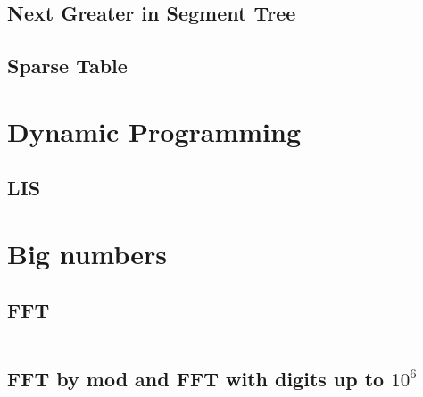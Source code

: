 \subsection{Next Greater in Segment Tree}

\subsection{Sparse Table}


\section{Dynamic Programming}

\subsection{LIS}


\section{Big numbers}
\subsection{FFT}
\inputminted[mathescape,tabsize=2]{cpp}{../BigNum/FFT.cpp}
\subsection{FFT by mod and FFT with digits up to $10^6$}
\inputminted[mathescape,tabsize=2]{cpp}{../BigNum/FFT_mod_ll.cpp}

